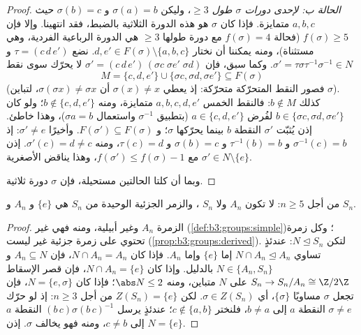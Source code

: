\begin{proof}
\emph{الحالة ب: لإحدى دورات $\sigma$ طول $\geq 3$}، وليكن
$\sigma(a) = b$ و $\sigma(b) = c$ حيث $a, b, c$ متمايزة. فإذا كان
$\sigma$ هو هذه الدورة الثلاثية بالضبط، فقد انتهينا. وإلا فإن
$f(\sigma) \geq 5$ (فحالة $f(\sigma) = 4$ مع دورة طولها $\geq3$ هي الدورة
الرباعية الفردية، وهي مستثناة)، ومنه يمكننا أن نختار $d, e' \in
F(\sigma) \setminus \{a, b, c\}$.
نضع $\tau = (c\,d\,e')$ و $\sigma' = \tau\sigma\tau^{-1}\sigma^{-1} \in N$. وكما سبق، فإن $\sigma' = (c\,d\,e')\,(\sigma c\;\sigma e'\;\sigma d)$ لا يحرّك سوى نقط
\[
M = \{c, d, e'\} \cup \{\sigma c, \sigma d, \sigma e'\}
\subseteq F(\sigma)
\]
(فصور النقط المتحرّكة متحرّكة: إذ يعطي $\sigma(x) \ne x$ أن $\sigma(\sigma x) \neq \sigma x$، لتباين
$\sigma$). كذلك $b \notin M$: فالنقط الخمس $a, b, c, d, e'$
متمايزة، ومنه $b
\notin \{c, d, e'\}$؛ ولو كان $b \in \{\sigma c, \sigma d, \sigma
e'\}$ لفُرض $a \in \{c, d, e'\}$ (بتطبيق
$\sigma^{-1}$ واستعمال $\sigma a = b$)، وهذا خاطئ. إذن يُثبّت
$\sigma'$ النقطة $b$ بينما يحرّكها $\sigma$؛ و $F(\sigma') \subseteq F(\sigma)$. وأخيرًا
$\sigma' \neq e$: إذ $\sigma^{-1}(c) = b$ و $\tau^{-1}(b) = b$ و $\sigma(b) = c$ و
$\tau(c) = d$، ومنه $\sigma'(c) = d \neq c$. إذن $\sigma' \in N
\setminus \{e\}$ مع $f(\sigma') \leq f(\sigma) - 1$، وهذا
يناقض الأصغرية.

وبما أن كلتا الحالتين مستحيلة، فإن $\sigma$ دورة ثلاثية.
\end{proof}

\begin{corollary}\label{cor:b3:groups:snnotsolvable}
من أجل $n \geq 5$: لا تكون $A_n$ ولا $S_n$ ، والزمر
الجزئية  الوحيدة من $S_n$ هي $\{e\}$ و $A_n$ و $S_n$.
\end{corollary}

\begin{proof}
الزمرة $A_n$  وغير أبيلية، ومنه فهي غير 
(\cref{def:b3:groups:simple})؛ وكل زمرة تحتوي على زمرة جزئية غير  ليست
 (\cref{prop:b3:groups:derived}). لتكن $N
\trianglelefteq S_n$: عندئذٍ تساوي $N \cap A_n \trianglelefteq A_n$
إما $\{e\}$ وإما $A_n$. فإذا كان $N \cap A_n = A_n$، فإن $A_n \subseteq N$ و $N \in \{A_n, S_n\}$
بالدليل. وإذا كان $N \cap A_n = \{e\}$، فإن قصر الإسقاط $S_n \to S_n/A_n \cong
\Z/2\Z$ على $N$ متباين،
ومنه $\abs N \leq 2$؛ فإذا كان $N = \{e, \sigma\}$، فإن  تجعل  $\sigma$ مساويًا $\{\sigma\}$، أي $\sigma \in Z(S_n)$. لكن
$Z(S_n) = \{e\}$ من أجل $n \geq 3$: إذ لو حرّك $\sigma \ne e$
النقطة $a$ إلى $b \neq a$، فلنختر $c
\notin \{a, b\}$؛ عندئذٍ يرسل $(b\,c)\sigma(b\,c)^{-1}$
النقطة $a$ إلى $c
\ne b$، ومنه فهو يخالف $\sigma$. إذن $N = \{e\}$.
\end{proof}

